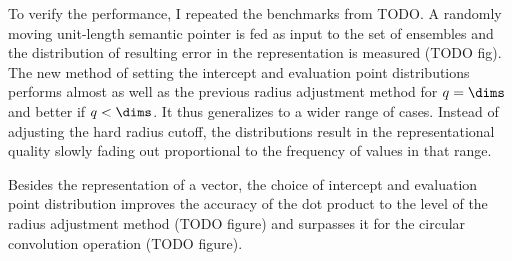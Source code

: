 To verify the performance, I repeated the benchmarks from TODO\@.
A randomly moving unit-length semantic pointer is fed as input to the set of ensembles and the distribution of resulting error in the representation is measured (TODO fig).
The new method of setting the intercept and evaluation point distributions performs almost as well as the previous radius adjustment method for $q = \dims$ and better if $q < \dims$.
It thus generalizes to a wider range of cases.
Instead of adjusting the hard radius cutoff, the distributions result in the representational quality slowly fading out proportional to the frequency of values in that range.

Besides the representation of a vector, the choice of intercept and evaluation point distribution improves the accuracy of the dot product to the level of the radius adjustment method (TODO figure) and surpasses it for the circular convolution operation (TODO figure).
